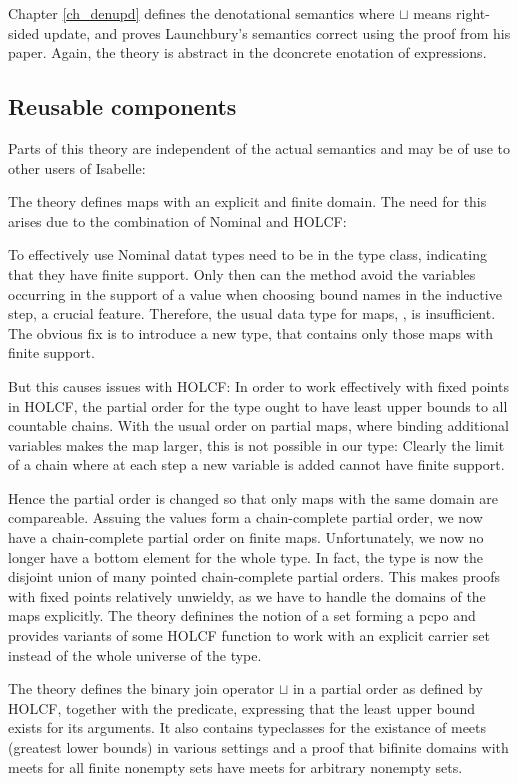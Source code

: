 \documentclass[11pt,a4paper,parskip=half]{scrartcl}
\begin{document}
Chapter \ref{ch_denupd} defines the denotational semantics where $\sqcup$ means right-sided update, and proves Launchbury's semantics correct using the proof from his paper. Again, the theory  is abstract in the dconcrete enotation of expressions.

\subsection{Reusable components}

Parts of this theory are independent of the actual semantics and may be of use to other users of Isabelle:

The theory  defines maps with an explicit and finite domain. The need for this arises due to the combination of Nominal and HOLCF:

To effectively use Nominal datat types need to be in the  type class, indicating that they have finite support. Only then can the  method avoid the variables occurring in the support of a value when choosing bound names in the inductive step, a crucial feature. Therefore, the usual data type for maps, , is insufficient. The obvious fix is to introduce a new type,  that contains only those maps with finite support.

But this causes issues with HOLCF: In order to work effectively with fixed points in HOLCF, the partial order for the type ought to have least upper bounds to all countable chains. With the usual order on partial maps, where binding additional variables makes the map larger, this is not possible in our type: Clearly the limit of a chain where at each step a new variable is added cannot have finite support.

Hence the partial order is changed so that only maps with the same domain are compareable. Assuing the values form a chain-complete partial order, we now have a chain-complete partial order on finite maps. Unfortunately, we now no longer have a bottom element for the whole type. In fact, the type is now the disjoint union of many pointed chain-complete partial orders. This makes proofs with fixed points relatively unwieldy, as we have to handle the domains of the maps explicitly. The theory  definines the notion of a set forming a pcpo and provides variants of some HOLCF function to work with an explicit carrier set instead of the whole universe of the type.

The theory  defines the binary join operator $\sqcup$ in a partial order as defined by HOLCF, together with the  predicate, expressing that the least upper bound exists for its arguments. It also contains typeclasses for the existance of meets (greatest lower bounds) in various settings and a proof that bifinite domains with meets for all finite nonempty sets have meets for arbitrary nonempty sets.
\end{document}

